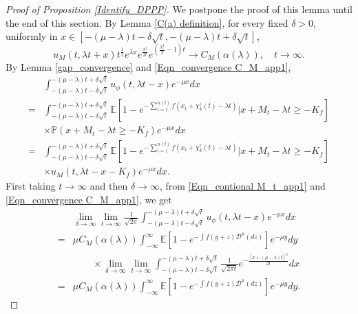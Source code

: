\documentclass[a4paper,reqno]{amsart}%
\newcommand{\1}{\mathbf 1}
\theoremstyle{mine}
\numberwithin{theorem}{section}
\numberwithin{equation}{section}
\theoremstyle{remark}
\begin{document}
\begin{proof}[Proof of Proposition \ref{Identify_DPPP}]
We postpone the proof of this lemma until the end of this section. 
By Lemma \ref{C(a) definition}, for every fixed $\delta >0$, uniformly in $x\in[-(\mu-\lambda) t-\delta\sqrt{t},-(\mu -\lambda) t+\delta\sqrt{t}]$,
\begin{equation}
  u_{M}(t,\lambda t+x)t^{\frac{1}{2}}e^{\lambda x}e^{\frac{x^{2}}{2t}}e^{(\frac{\lambda^{2}}{2}-1)t} \to C_{M}(\alpha(\lambda)), \quad t\to\infty. \label{Eqn_convergence C_M_app1}
\end{equation}
By Lemma \ref{gap_convergence} and \eqref{Eqn_convergence C_M_app1},
\begin{equation}
    \begin{aligned}
        &\int_{-(\mu -\lambda)t-\delta\sqrt{t}}^{-(\mu-\lambda)t+\delta\sqrt{t}}u_{\phi}(t,\lambda t-x)e^{-\mu x}dx\\
        =&\int_{-(\mu -\lambda)t-\delta\sqrt{t}}^{-(\mu-\lambda)t+\delta\sqrt{t}}\mathbb{E}[1-e^{-\sum_{i = 1}^{n(t)} f(x_{i}+\chi_{k}^{i}(t) - \lambda t)}|x+M_{t} -\lambda t\ge -K_{f}]\\
        & \times \mathbb{P}(x+M_{t} -\lambda t\ge -K_{f})e^{-\mu x}dx\\
        =&\int_{-(\mu -\lambda)t-\delta\sqrt{t}}^{-(\mu-\lambda)t+\delta\sqrt{t}}\mathbb{E}[1-e^{-\sum_{i = 1}^{n(t)} f(x_{i}+\chi_{k}^{i}(t) - \lambda t)}|x+M_{t} -\lambda t\ge -K_{f}]\\
        & \times u_{M}(t,\lambda t-x-K_{f})e^{-\mu x}dx.
    \end{aligned}
\end{equation}
First taking $t\to\infty$ and then $\delta\to\infty$, from \eqref{Eqn_contional M_t_app1} and \eqref{Eqn_convergence C_M_app1}, we get 
\begin{equation}
    \begin{aligned}
        &\lim_{\delta \to\infty}\lim_{t\to\infty}\frac{1}{\sqrt{2\pi}}\int_{-(\mu -\lambda)t-\delta\sqrt{t}}^{-(\mu-\lambda)t+\delta\sqrt{t}}u_{\phi}(t,\lambda t-x)e^{-\mu x}dx\\
        =&\mu C_{M}(\alpha(\lambda))\int_{-\infty}^{\infty}\mathbb{E}[1-e^{-\int f(y+z)\mathcal{D}^{\mu}(dz) }]e^{-\mu y}dy\\
    &\qquad \times \lim_{\delta\to \infty}\lim_{t\to\infty}\int_{-(\mu -\lambda)t-\delta\sqrt{t}}^{-(\mu-\lambda)t+\delta\sqrt{t}}\frac{1}{\sqrt{2\pi t}}e^{-\frac{[x+(\mu-\lambda)t]^{2}}{2t}}dx\\
    =&\mu C_{M}(\alpha(\lambda))\int_{-\infty}^{\infty}\mathbb{E}[1-e^{-\int f(y+z)\mathcal{D}^{\mu}(dz) }]e^{-\mu y}dy. 
    \end{aligned}

\end{equation}
\end{proof}
\end{document}
